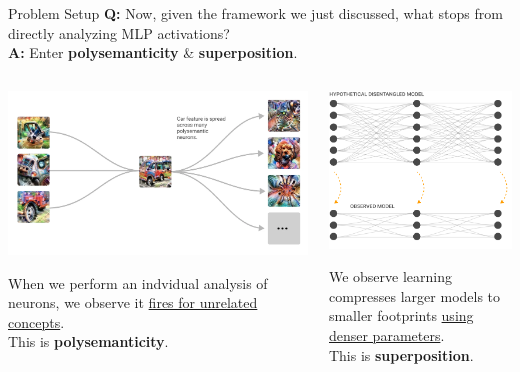 \documentclass{beamer}
\begin{document}
\begin{frame}{Problem Setup}
	\textbf{Q:} Now, given the framework we just discussed, what stops from directly analyzing MLP activations? \pause \\
	\textbf{A:} Enter \textbf{polysemanticity} \& \textbf{superposition}. \pause

	\begin{columns}
		\begin{column}{.44\textwidth}
			\begin{center}
				\includegraphics[width=\textwidth]{img/polysemanticity.png}
			\end{center}
			When we perform an indvidual analysis of neurons, we observe it \underline{fires for unrelated concepts}. \newline \\

			This is \textbf{polysemanticity}. \pause
		\end{column}
		\begin{column}{.5\textwidth}
			\begin{center}
				\includegraphics[width=.6\textwidth]{img/superposition.png}
			\end{center}
			We observe learning compresses larger models to smaller footprints \underline{using denser parameters}. \newline \\
			This is \textbf{superposition}.
		\end{column}
	\end{columns}
\end{frame}
\end{document}
